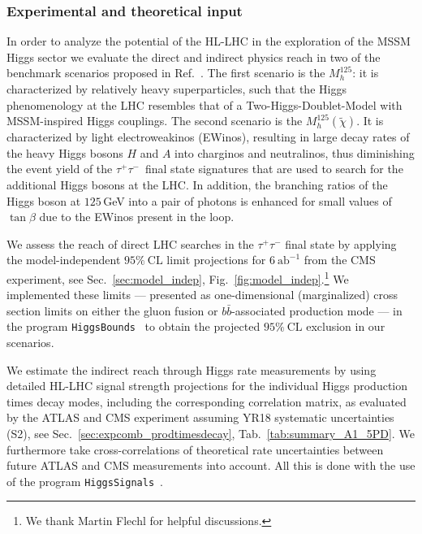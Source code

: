 \subsubsection{Experimental and theoretical input}

In order to analyze the potential of the HL-LHC in the exploration of the MSSM Higgs sector we evaluate the direct and indirect physics reach in two of the benchmark scenarios proposed in Ref.~\cite{Bahl:2018zmf}. The first scenario is the $M_h^{125}$: it is characterized by relatively heavy superparticles, such that the Higgs phenomenology at the LHC resembles that of a Two-Higgs-Doublet-Model with MSSM-inspired Higgs couplings. The second scenario is the $M_h^{125}(\tilde{\chi})$. It is characterized by light electroweakinos (EWinos), resulting in large decay rates of the heavy Higgs bosons $H$ and $A$ into charginos and neutralinos, thus diminishing the event yield of the $\tau^+\tau^-$~final state signatures that are used to search
for the additional Higgs bosons at the LHC. In addition, the branching ratios of the Higgs boson at $125$\,GeV into a pair of photons is enhanced for small values of $\tan\beta$ due to the EWinos present in the loop.

We assess the reach of direct LHC searches in the  $\tau^+\tau^-$
final state by applying the model-independent $95\%~\mathrm{CL}$
limit projections for $6~\mathrm{ab}^{-1}$ from the CMS experiment, see Sec.~\ref{sec:model_indep}, Fig.~\ref{fig:model_indep}.\footnote{We thank Martin Flechl for helpful discussions.} 
We implemented these limits --- presented as one-dimensional (marginalized) cross section limits on either the
gluon fusion or $b\bar{b}$-associated production mode --- in the program
\texttt{HiggsBounds}~\cite{Bechtle:2008jh,Bechtle:2011sb,Bechtle:2013wla,Bechtle:2015pma} to obtain the projected $95\%~\mathrm{CL}$ exclusion in our scenarios.

We estimate the indirect reach through Higgs rate measurements by
using detailed HL-LHC signal strength projections for the individual
Higgs production times decay modes, including the corresponding
correlation matrix, as evaluated by the ATLAS and CMS experiment assuming YR18 systematic uncertainties (S2), see Sec.~\ref{sec:expcomb_prodtimesdecay}, Tab.~\ref{tab:summary_A1_5PD}.  We furthermore take cross-correlations of theoretical
rate uncertainties between future ATLAS and CMS measurements into
account. All this is done with the use of the program
\texttt{HiggsSignals}~\cite{Bechtle:2013xfa}. 

